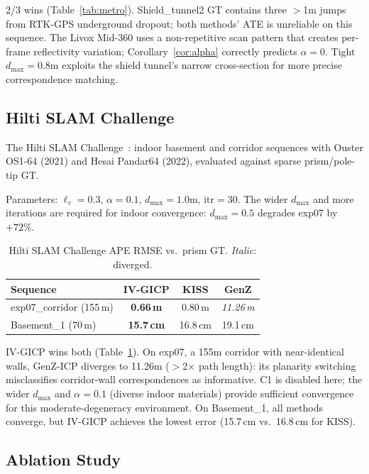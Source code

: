 \documentclass[journal,letterpaper,10pt]{IEEEtran}
\newcommand{\best}[1]{\textbf{#1}}
\begin{document}
2/3 wins (Table~\ref{tab:metro}).
Shield\_tunnel2 GT contains three $>$1m jumps from RTK-GPS underground
dropout; both methods' ATE is unreliable on this sequence.
The Livox Mid-360 uses a non-repetitive scan pattern that creates
per-frame reflectivity variation; Corollary~\ref{cor:alpha} correctly
predicts $\alpha{=}0$.
Tight $d_{\max}{=}0.8$m exploits the shield tunnel's narrow
cross-section for more precise correspondence matching.

\subsection{Hilti SLAM Challenge}\label{sec:hilti}

The Hilti SLAM Challenge~\cite{helmberger2022hilti}: indoor basement
and corridor sequences with Ouster OS1-64 (2021) and Hesai Pandar64
(2022), evaluated against sparse prism/pole-tip GT.

Parameters: $\ell_v{=}0.3$, $\alpha{=}0.1$, $d_{\max}{=}1.0$m,
$\mathrm{itr}{=}30$.
The wider $d_{\max}$ and more iterations are required for indoor
convergence: $d_{\max}{=}0.5$ degrades exp07 by $+72\%$.

\begin{table}[t]
\centering
\caption{Hilti SLAM Challenge APE RMSE vs.\ prism GT.
  \textit{Italic}: diverged.}
\label{tab:hilti}
\begin{tabular}{lccc}
\toprule
Sequence & IV-GICP & KISS & GenZ \\
\midrule
exp07\_corridor (155\,m) & \best{0.66\,m} & 0.80\,m & \textit{11.26\,m} \\
Basement\_1 (70\,m)      & \best{15.7\,cm} & 16.8\,cm & 19.1\,cm \\
\bottomrule
\end{tabular}
\end{table}

IV-GICP wins both (Table~\ref{tab:hilti}).
On exp07, a 155m corridor with near-identical walls, GenZ-ICP diverges
to 11.26m ($>$2$\times$ path length): its planarity switching
misclassifies corridor-wall correspondences as informative.
C1 is disabled here; the wider $d_{\max}$ and $\alpha{=}0.1$
(diverse indoor materials) provide sufficient convergence for this
moderate-degeneracy environment.
On Basement\_1, all methods converge, but IV-GICP achieves the lowest
error (15.7\,cm vs.\ 16.8\,cm for KISS).

\subsection{Ablation Study}\label{sec:ablation}
\end{document}
